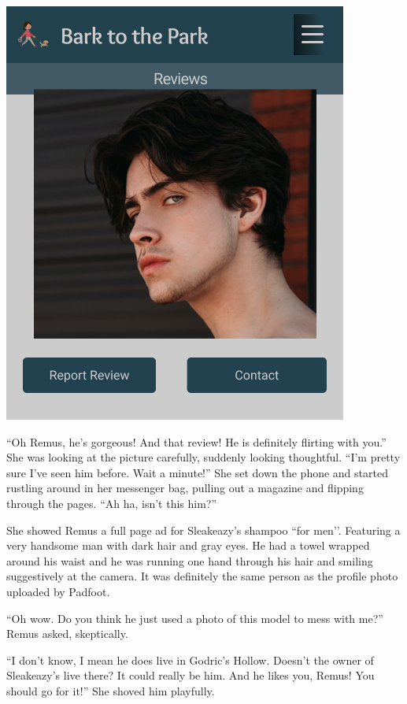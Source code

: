 \documentclass[12pt,twoside,openright]{memoir}
\begin{document}
{\centering\includegraphics[width=\textwidth]{photo overlay}}

``Oh Remus, he's gorgeous! And that review! He is definitely flirting with you.'' She was looking at the picture carefully, suddenly looking thoughtful. ``I'm pretty sure I've seen him before. Wait a minute!'' She set down the phone and started rustling around in her messenger bag, pulling out a magazine and flipping through the pages. ``Ah ha, isn't this him?''

She showed Remus a full page ad for Sleakeazy's shampoo ``for men'{}'. Featuring a very handsome man with dark hair and gray eyes. He had a towel wrapped around his waist and he was running one hand through his hair and smiling suggestively at the camera. It was definitely the same person as the profile photo uploaded by Padfoot.

``Oh wow. Do you think he just used a photo of this model to mess with me?'' Remus asked, skeptically.

``I don't know, I mean he does live in Godric's Hollow. Doesn't the owner of Sleakeazy's live there? It could really be him. And he likes you, Remus! You should go for it!'' She shoved him playfully. 
\end{document}
